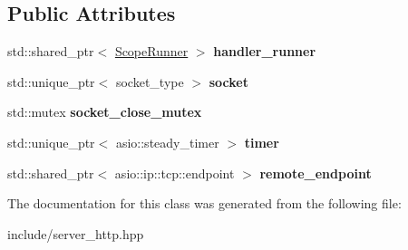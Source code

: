 \subsection*{Public Attributes}
\begin{DoxyCompactItemize}
\item 
std\+::shared\+\_\+ptr$<$ \hyperlink{classSimpleWeb_1_1ScopeRunner}{Scope\+Runner} $>$ {\bfseries handler\+\_\+runner}\hypertarget{classSimpleWeb_1_1ServerBase_1_1Connection_aa56211046c5bbe2dfb7a23520fa09a1e}{}\label{classSimpleWeb_1_1ServerBase_1_1Connection_aa56211046c5bbe2dfb7a23520fa09a1e}

\item 
std\+::unique\+\_\+ptr$<$ socket\+\_\+type $>$ {\bfseries socket}\hypertarget{classSimpleWeb_1_1ServerBase_1_1Connection_a3be524cda1ab1417547bed20f1cdf8b5}{}\label{classSimpleWeb_1_1ServerBase_1_1Connection_a3be524cda1ab1417547bed20f1cdf8b5}

\item 
std\+::mutex {\bfseries socket\+\_\+close\+\_\+mutex}\hypertarget{classSimpleWeb_1_1ServerBase_1_1Connection_a8ebe4acc8e396f908116e891206a1edb}{}\label{classSimpleWeb_1_1ServerBase_1_1Connection_a8ebe4acc8e396f908116e891206a1edb}

\item 
std\+::unique\+\_\+ptr$<$ asio\+::steady\+\_\+timer $>$ {\bfseries timer}\hypertarget{classSimpleWeb_1_1ServerBase_1_1Connection_af6dd071d190e354bec832843d08d31c5}{}\label{classSimpleWeb_1_1ServerBase_1_1Connection_af6dd071d190e354bec832843d08d31c5}

\item 
std\+::shared\+\_\+ptr$<$ asio\+::ip\+::tcp\+::endpoint $>$ {\bfseries remote\+\_\+endpoint}\hypertarget{classSimpleWeb_1_1ServerBase_1_1Connection_ae71f5a28753896a63688da963c7bc9ff}{}\label{classSimpleWeb_1_1ServerBase_1_1Connection_ae71f5a28753896a63688da963c7bc9ff}

\end{DoxyCompactItemize}


The documentation for this class was generated from the following file\+:\begin{DoxyCompactItemize}
\item 
include/server\+\_\+http.\+hpp\end{DoxyCompactItemize}
